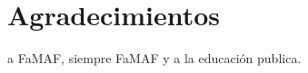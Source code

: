 \documentclass[aps,prl,twocolumn,groupedaddress]{revtex4-2}
\begin{document}
\section{Agradecimientos}

\begin{acknowledgments}
a FaMAF, siempre FaMAF y a la educación publica.
\end{acknowledgments}



\onecolumngrid

\appendix
\end{document}
